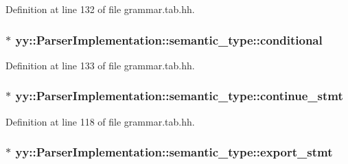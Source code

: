 Definition at line 132 of file grammar.tab.hh.

\hypertarget{unionyy_1_1_parser_implementation_1_1semantic__type_a9a3ea613413cad80d6cc58e367f8192e}{
\subsubsection[{conditional}]{$\ast$ {\bf yy::ParserImplementation::semantic\_\-type::conditional}}}
\label{unionyy_1_1_parser_implementation_1_1semantic__type_a9a3ea613413cad80d6cc58e367f8192e}


Definition at line 133 of file grammar.tab.hh.

\hypertarget{unionyy_1_1_parser_implementation_1_1semantic__type_ae1b3122a350ae0e41541233d39a7b1ba}{
\subsubsection[{continue\_\-stmt}]{$\ast$ {\bf yy::ParserImplementation::semantic\_\-type::continue\_\-stmt}}}
\label{unionyy_1_1_parser_implementation_1_1semantic__type_ae1b3122a350ae0e41541233d39a7b1ba}


Definition at line 118 of file grammar.tab.hh.

\hypertarget{unionyy_1_1_parser_implementation_1_1semantic__type_a8fb6992c7639f10531fce515c9f6a62c}{
\subsubsection[{export\_\-stmt}]{$\ast$ {\bf yy::ParserImplementation::semantic\_\-type::export\_\-stmt}}}
\label{unionyy_1_1_parser_implementation_1_1semantic__type_a8fb6992c7639f10531fce515c9f6a62c}


